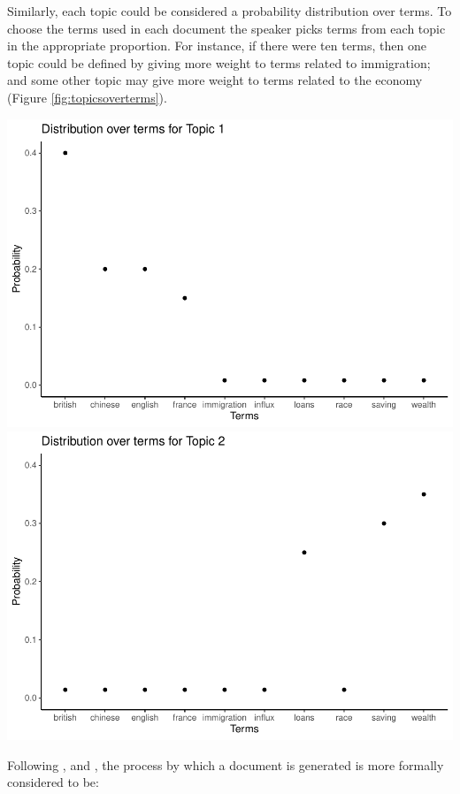 \documentclass[
]{book}
\begin{document}
Similarly, each topic could be considered a probability distribution over terms. To choose the terms used in each document the speaker picks terms from each topic in the appropriate proportion. For instance, if there were ten terms, then one topic could be defined by giving more weight to terms related to immigration; and some other topic may give more weight to terms related to the economy (Figure \ref{fig:topicsoverterms}).

\includegraphics{telling_stories_with_data_files/figure-latex/topicsoverterms-1.pdf} \includegraphics{telling_stories_with_data_files/figure-latex/topicsoverterms-2.pdf}

Following \citet{BleiLafferty2009}, \citet{blei2012} and \citet{GriffithsSteyvers2004}, the process by which a document is generated is more formally considered to be:
\end{document}
